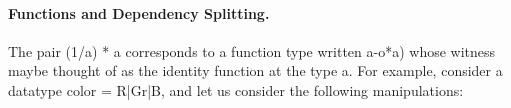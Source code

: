\documentclass[preprint]{sigplanconf}
\begin{document}
\paragraph*{Functions and Dependency Splitting.} 


The pair {{(1/a) * a}} corresponds to a function type written {{a-o*a}})
whose witness maybe thought of as the identity function at the type {{a}}.
For example, consider a datatype {{color = R|Gr|B}}, and let us consider the
following manipulations:

\end{document}
